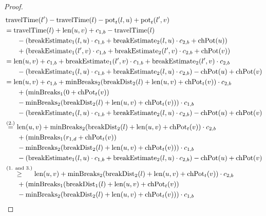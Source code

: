 \begin{proof}
	\begin{align}
		\begin{split}\label{eq:label_n_feasibility_proof_2}
			&\concretett(l') - \concretett(l) - \concretepotential_t(l,u) + \concretepotential_t(l',v)\\
			&= \concretett(l) + \len(u,v) + \restr_{1,b} - \concretett(l)\\
			& \phantom{{}=1} - (\breakEstimate_1(l,u) \cdot \restr_{1,b} + \breakEstimate_2(l,u) \cdot \restr_{2,b} + \chpotential(u))\\
			& \phantom{{}=1} + (\breakEstimate_1(l',v) \cdot \restr_{1,b} + \breakEstimate_2(l',v) \cdot \restr_{2,b} + \chpotential(v))\\
			&= \len(u,v) + \restr_{1,b} + \breakEstimate_1(l',v) \cdot \restr_{1,b} + \breakEstimate_2(l',v) \cdot \restr_{2,b} \\
			& \phantom{{}=1} - (\breakEstimate_1(l,u) \cdot \restr_{1,b} + \breakEstimate_2(l,u) \cdot \restr_{2,b}) - \chpotential(u) + \chpotential(v)\\
			&= \len(u,v) + \restr_{1,b} + \minBreaks_2(\breakDist_2(l) + \len(u,v) + \chpotential_t(v)) \cdot \restr_{2,b}\\
			& \phantom{{}=1} + (\minBreaks_1(0 + \chpotential_t(v))\\
			& \phantom{{}=1} - \minBreaks_{2}(\breakDist_{2}(l) + \len(u,v) + \chpotential_t(v))) \cdot \restr_{1,b} \\
			& \phantom{{}=1} - (\breakEstimate_1(l,u) \cdot \restr_{1,b} + \breakEstimate_2(l,u) \cdot \restr_{2,b}) - \chpotential(u) + \chpotential(v)\\
			&\stackrel{\text{(2.)}}{=} \len(u,v) + \minBreaks_2(\breakDist_2(l) + \len(u,v) + \chpotential_t(v)) \cdot \restr_{2,b}\\
			& \phantom{{}=1} + (\minBreaks_1(r_{1,d} + \chpotential_t(v))\\
			& \phantom{{}=1} - \minBreaks_{2}(\breakDist_{2}(l) + \len(u,v) + \chpotential_t(v))) \cdot \restr_{1,b} \\
			& \phantom{{}=1} - (\breakEstimate_1(l,u) \cdot \restr_{1,b} + \breakEstimate_2(l,u) \cdot \restr_{2,b}) - \chpotential(u) + \chpotential(v)\\
			&\stackrel{\text{(1. and 3.)}}{\ge} \len(u,v) + \minBreaks_2(\breakDist_2(l) + \len(u,v) + \chpotential_t(v)) \cdot \restr_{2,b}\\
			& \phantom{{}=1} + (\minBreaks_1(\breakDist_1(l) + \len(u,v) + \chpotential_t(v))\\
			& \phantom{{}=1} - \minBreaks_{2}(\breakDist_{2}(l) + \len(u,v) + \chpotential_t(v))) \cdot \restr_{1,b} \\

\end{split}
\end{align}
\end{proof}
